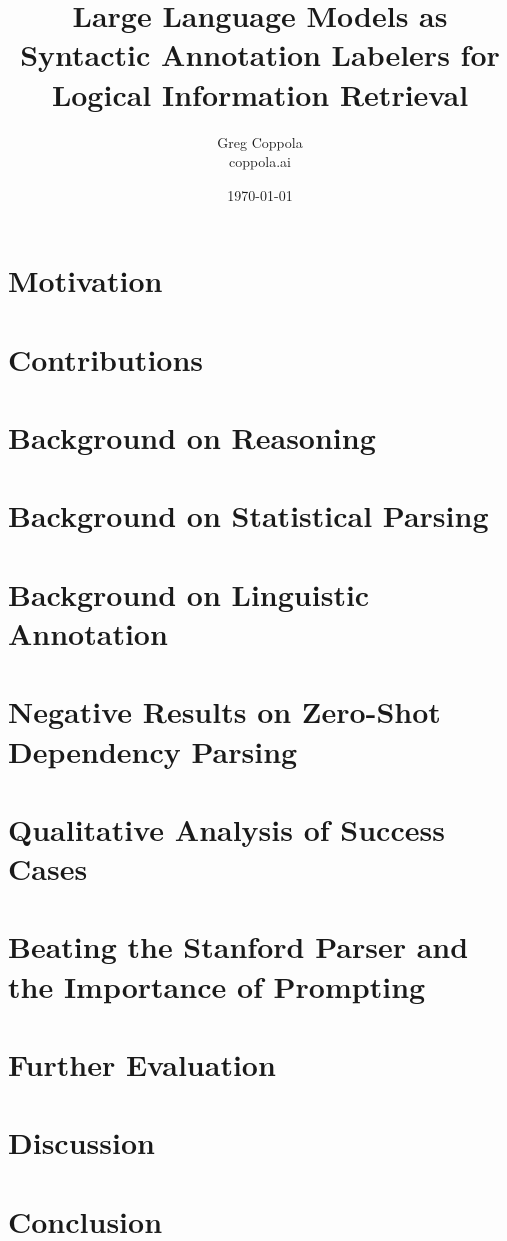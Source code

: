 \documentclass[11pt]{article}
\title{Large Language Models as Syntactic Annotation Labelers for Logical Information Retrieval}
\author{Greg Coppola\\coppola.ai}
\date{\today}
\begin{document}
\maketitle



\section{Motivation}


\section{Contributions}


\section{Background on Reasoning}


\section{Background on Statistical Parsing}


\section{Background on Linguistic Annotation}


\section{Negative Results on Zero-Shot Dependency Parsing}


\section{Qualitative Analysis of Success Cases}


\section{Beating the Stanford Parser and the Importance of Prompting}



\section{Further Evaluation}


\section{Discussion}


\section{Conclusion}




\end{document}
